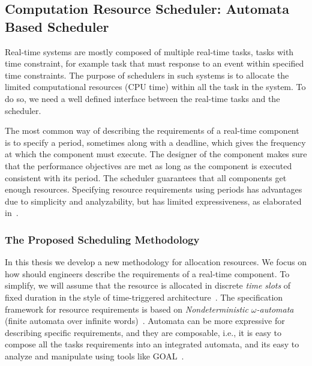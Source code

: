 \documentclass[ twoside, 12pt ]{article}
\begin{document}
{\subsection{Computation Resource Scheduler: Automata Based Scheduler}
\label{sec:scheduler}

Real-time systems are mostly composed of multiple real-time tasks, tasks with time constraint, for example task that must response to an event within specified time constraints.
The purpose of schedulers in such systems is to allocate the limited computational resources (CPU time) within all the task in the system. To do so, we need a well defined interface between the real-time tasks and the scheduler.

The most common way of describing the requirements of a real-time component is to specify a period, sometimes along with a deadline, which gives the frequency at which the component must execute. 
The designer of the component makes sure that the performance objectives are met as long as the component is executed consistent with its period. The scheduler guarantees that all components get enough resources.
Specifying resource requirements using periods has advantages due to simplicity and analyzability, but has limited expressiveness, as elaborated in~\cite{RTComposer}. 





\subsubsection{The Proposed Scheduling Methodology}
In this thesis we develop a new methodology for allocation resources. We focus on how should engineers describe the requirements of a real-time component.
To simplify, we will assume that the resource is allocated in discrete \textit{time slots} of fixed duration in the style of time-triggered architecture~\cite{RTComposer}.
The specification framework for resource requirements is based on \textit{Nondeterministic $\omega$-automata} (finite automata over infinite words)~\cite{???}.
Automata can be more expressive for describing specific requirements, and they are composable, i.e., it is easy to compose all the tasks requirements into an integrated automata, and its easy to analyze and manipulate using tools like GOAL~\cite{???}.


}
\end{document}
